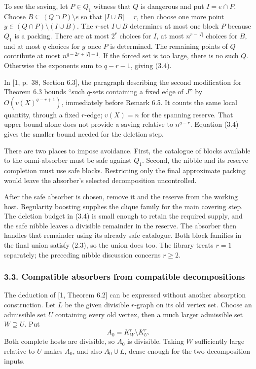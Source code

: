 \documentclass[english,11pt,a4paper]{article}
\begin{document}
To see the saving, let \(P\in Q_1\) witness that \(Q\) is dangerous and put \(I=e\cap P\). Choose \(B\subseteq(Q\cap P)\setminus e\) so that \(|I\cup B|=r\), then choose one more point \(y\in(Q\cap P)\setminus(I\cup B)\). The \(r\)-set \(I\cup B\) determines at most one block \(P\) because \(Q_1\) is a packing. There are at most \(2^r\) choices for \(I\), at most \(n^{r-|I|}\) choices for \(B\), and at most \(q\) choices for \(y\) once \(P\) is determined. The remaining points of \(Q\) contribute at most \(n^{q-2r+|I|-1}\). If the forced set is too large, there is no such \(Q\). Otherwise the exponents sum to \(q-r-1\), giving (3.4).

In {[}1, p.~38, Section 6.3{]}, the paragraph describing the second modification for Theorem 6.3 bounds ``such \(q\)-sets containing a fixed edge of \(J\)'' by \(O(v(X)^{q-r+1})\), immediately before Remark 6.5. It counts the same local quantity, through a fixed \(r\)-edge; \(v(X)=n\) for the spanning reserve. That upper bound alone does not provide a saving relative to \(n^{q-r}\). Equation (3.4) gives the smaller bound needed for the deletion step.

There are two places to impose avoidance. First, the catalogue of blocks available to the omni-absorber must be safe against \(Q_1\). Second, the nibble and its reserve completion must use safe blocks. Restricting only the final approximate packing would leave the absorber's selected decomposition uncontrolled.

After the safe absorber is chosen, remove it and the reserve from the working host. Regularity boosting supplies the clique family for the main covering step. The deletion budget in (3.4) is small enough to retain the required supply, and the safe nibble leaves a divisible remainder in the reserve. The absorber then handles that remainder using its already safe catalogue. Both block families in the final union satisfy (2.3), so the union does too. The library treats \(r=1\) separately; the preceding nibble discussion concerns \(r\ge2\).


\subsubsection{3.3. Compatible absorbers from compatible decompositions}\label{compatible-absorbers-from-compatible-decompositions}

The deduction of {[}1, Theorem 6.2{]} can be expressed without another absorption construction. Let \(L\) be the given divisible \(r\)-graph on its old vertex set. Choose an admissible set \(U\) containing every old vertex, then a much larger admissible set \(W\supseteq U\). Put \[A_0=K_W^r\setminus K_U^r.
\tag{3.5}\] Both complete hosts are divisible, so \(A_0\) is divisible. Taking \(W\) sufficiently large relative to \(U\) makes \(A_0\), and also \(A_0\cup L\), dense enough for the two decomposition inputs.
\end{document}
